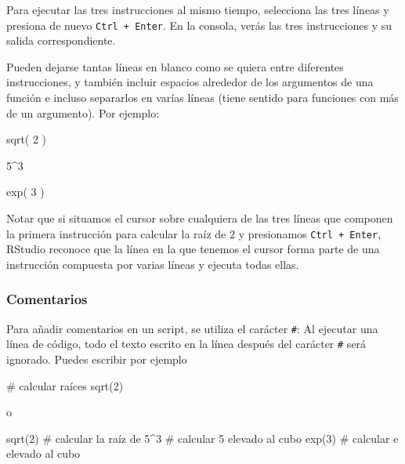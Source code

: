 \documentclass[
  title=normal,
  notoc,
  bib=normal]{mnye}
\newenvironment{Shaded}{\begin{snugshade}}{\end{snugshade}}
\newcommand{\FunctionTok}[1]{\textcolor[rgb]{0.00,0.00,0.00}{#1}}
\newcommand{\NormalTok}[1]{#1}
\begin{document}
Para ejecutar las tres instrucciones al mismo tiempo, selecciona las tres líneas y presiona de nuevo \texttt{Ctrl\ +\ Enter}. En la consola, verás las tres instrucciones y su salida correspondiente.

\href{https://drive.google.com/uc?id=1KGhdm3zmBnbEDJJ3-AmS3TTmoeKranKw&export=view}{\faVideoCamera}

Pueden dejarse tantas líneas en blanco como se quiera entre diferentes instrucciones, y también incluir espacios alrededor de los argumentos de una función e incluso separarlos en varías líneas (tiene sentido para funciones con más de un argumento). Por ejemplo:

\begin{Shaded}
\begin{Highlighting}[]
\NormalTok{sqrt(}
\NormalTok{    2}
\NormalTok{)}

\NormalTok{5\^{}3}

\NormalTok{exp( 3 )}
\end{Highlighting}
\end{Shaded}

Notar que si situamos el cursor sobre cualquiera de las tres líneas que componen la primera instrucción para calcular la raíz de \(2\) y presionamos \texttt{Ctrl\ +\ Enter}, \textsf{RStudio} reconoce que la línea en la que tenemos el cursor forma parte de una instrucción compuesta por varias líneas y ejecuta todas ellas.

\hypertarget{comentarios}{%
\subsubsection{Comentarios}\label{comentarios}}

Para añadir comentarios en un script, se utiliza el carácter \texttt{\#}: Al ejecutar una línea de código, todo el texto escrito en la línea después del carácter \texttt{\#} será ignorado. Puedes escribir por ejemplo

\begin{Shaded}
\begin{Highlighting}[]
\FunctionTok{\# calcular raíces }
\NormalTok{sqrt(2)}
\end{Highlighting}
\end{Shaded}

o

\begin{Shaded}
\begin{Highlighting}[]
\NormalTok{sqrt(2) \# calcular la raíz de }
\NormalTok{5\^{}3     \# calcular 5 elevado al cubo}
\NormalTok{exp(3)  \# calcular e elevado al cubo}
\end{Highlighting}
\end{Shaded}
\end{document}
